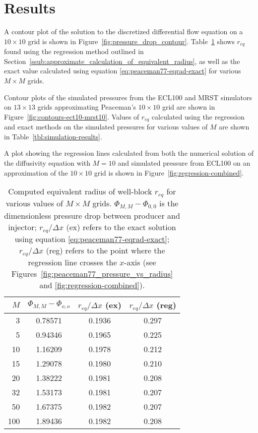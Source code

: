 
\section{Results} %
\label{sec:results}
A contour plot of the solution to the discretized differential flow equation on a $10 \times 10$ grid is shown in Figure~\ref{fig:pressure_drop_contour}. Table~\ref{tbl:peaceman-results} shows $r_{eq}$ found using the regression method outlined in Section~\ref{ssub:approximate_calculation_of_equivalent_radius}, as well as the exact value calculated using equation \eqref{eq:peaceman77-eqrad-exact} for various $M\times M$ grids.

Contour plots of the simulated pressures from the ECL100 and MRST simulators on $13\times 13$ grids approximating Peaceman's $10\times 10$ grid are shown in Figure~\ref{fig:contours-ect10-mrst10}. Values of $r_{eq}$ calculated using the regression and exact methods on the simulated pressures for various values of $M$ are shown in Table~\ref{tbl:simulation-results}.

A plot showing the regression lines calculated from both the numerical solution of the diffusivity equation with $M=10$ and simulated pressure from ECL100 on an approximation of the $10\times 10$ grid is shown in Figure~\ref{fig:regression-combined}.



\begin{table}[htbp]
    \centering
    \caption{Computed equivalent radius of well-block $r_{eq}$ for various values of $M\times M$ grids. $\Phi_{M,M} - \Phi_{0,0}$ is the dimensionless pressure drop between producer and injector; $r_{eq}/\Delta x$ (ex) refers to the exact solution using equation \eqref{eq:peaceman77-eqrad-exact}; $r_{eq} / \Delta x$ (reg) refers to the point where the regression line crosses the $x$-axis (see Figures~\ref{fig:peaceman77_pressure_vs_radius} and \ref{fig:regression-combined}).}
    \begin{tabular}{r|ccc}
        \toprule
        $M$ & $\Phi_{M,M} - \Phi_{o,o}$ & $r_{eq}/\Delta x$ (ex) & $r_{eq} / \Delta x$ (reg)  \\
        \midrule
        3   & 0.78571 & 0.1936 & 0.297 \\
        5   & 0.94346 & 0.1965 & 0.225 \\
        10  & 1.16209 & 0.1978 & 0.212 \\
        15  & 1.29078 & 0.1980 & 0.210 \\
        20  & 1.38222 & 0.1981 & 0.208 \\
        32  & 1.53173 & 0.1981 & 0.207 \\
        50  & 1.67375 & 0.1982 & 0.207 \\
        100 & 1.89436 & 0.1982 & 0.208 \\
        \bottomrule
    \end{tabular}
    \label{tbl:peaceman-results}
\end{table}

